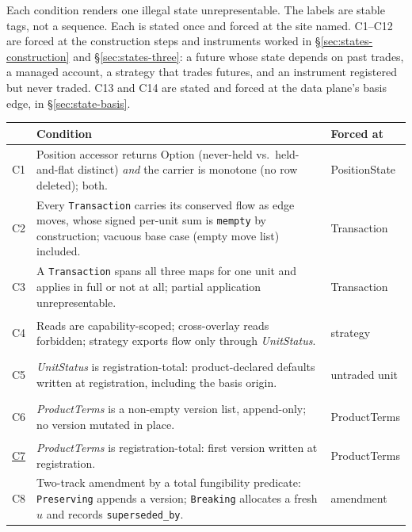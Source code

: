 Each condition renders one illegal state unrepresentable. The labels are stable tags, not
a sequence. Each is stated once and forced at the site named. C1--C12 are forced
at the construction steps and instruments worked in \S\ref{sec:states-construction} and
\S\ref{sec:states-three}: a future whose state depends on past trades, a managed
account, a strategy that trades futures, and an instrument registered but never traded. C13 and C14 are stated and forced at the data plane's basis edge, in
\S\ref{sec:state-basis}.

\begin{longtable}{@{}p{0.8cm} p{11.0cm} p{2.5cm}@{}}
\toprule
 & \textbf{Condition} & \textbf{Forced at} \\
\midrule
\endhead
\hypertarget{cond:C1}{C1}\label{cond:C1} & Position accessor returns $\mathrm{Option}$
(never-held vs.\ held-and-flat distinct) \emph{and} the carrier is monotone (no row
deleted); both. & PositionState \\
\addlinespace
\hypertarget{cond:C2}{C2}\label{cond:C2} & Every \texttt{Transaction} carries its conserved
flow as edge moves, whose signed per-unit sum is \texttt{mempty} by construction; vacuous
base case (empty move list) included. & Transaction \\
\addlinespace
\hypertarget{cond:C3}{C3}\label{cond:C3} & A \texttt{Transaction} spans all three maps for
one unit and applies in full or not at all; partial application unrepresentable. &
Transaction \\
\addlinespace
\hypertarget{cond:C4}{C4}\label{cond:C4} & Reads are capability-scoped; cross-overlay reads
forbidden; strategy exports flow only through \emph{UnitStatus}. & strategy \\
\addlinespace
\hypertarget{cond:C5}{C5}\label{cond:C5} & \emph{UnitStatus} is registration-total:
product-declared defaults written at registration, including the basis origin. &
untraded unit \\
\addlinespace
\hypertarget{cond:C6}{C6}\label{cond:C6} & \emph{ProductTerms} is a non-empty version list,
append-only; no version mutated in place. & ProductTerms \\
\addlinespace
\hyperref[cond:C7]{C7} & \emph{ProductTerms} is registration-total: first
version written at registration. & ProductTerms \\
\addlinespace
\hypertarget{cond:C8}{C8}\label{cond:C8} & Two-track amendment by a total fungibility
predicate: \texttt{Preserving} appends a version; \texttt{Breaking} allocates a fresh $u$
and records \texttt{superseded\_by}. & amendment \\

\end{longtable}

